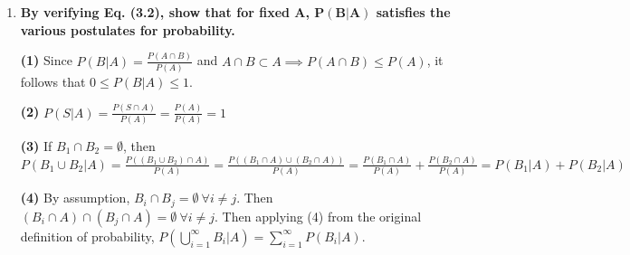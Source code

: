 \documentclass[10pt, oneside]{article}
\begin{document}
\begin{enumerate}[label=3.\arabic*]
\begin{enumerate}
\begin{align*}
	P_{A,B} (i + j \leq 9) &= P_{A,B} (i + j \leq 8) + P_A (3) P_B (6) + P_A (4) P_B (5) + P_A (5) P_B (4) + P_A (6) P_B (3) \\
	&= 0.895 + (0.2)(0.15) + (0.09)(0.15) + (0.07)(0.1) + (0.04)(0.1) \\
	&= \boxed{0.9495} \\
	P_{A,B} (i + j \leq 10) &= P_{A,B} (i + j \leq 9) + P_A (4) P_B (6) + P_A (5) P_B (5) + P_A (6) P_B (4) \\
	&= 0.9495 + (0.09)(0.15) + (0.07)(0.15) + (0.04)(0.1) \\
	&= \boxed{0.9775} \\
	P_{A,B} (i + j \leq 11) &= P_{A,B} (i + j \leq 10) + P_A (5) P_B (6) + P_A (6) P_B (5) \\
	&= 0.9775 + (0.07)(0.15) + (0.04)(0.15) \\
	&= \boxed{0.994} \\
	P_{A,B} (i + j \leq 12) &= P_{A,B} (i + j \leq 11) + P_A (6) P_B (6) \\
	&= 0.994 + (0.04)(0.15) \\
	&= \boxed{1}
	\end{align*}
	
	\end{enumerate}

\newpage
\item  \begin{tcolorbox}[
  colback=Cerulean!5!white,
  colframe=Cerulean!75!black]
\textbf{By verifying Eq. (3.2), show that for fixed $\bm{A}$, $\bm{P(B | A)}$ satisfies the various postulates for probability.}
\end{tcolorbox}

\textbf{(1)} Since $P(B | A) = \frac{P(A \cap B)}{P(A)}$ and $A \cap B \subset A \implies P(A \cap B) \leq P(A)$, it follows that $0 \leq P(B | A) \leq 1$.

\textbf{(2)} $P(S | A) = \frac{P(S \cap A)}{P(A)} = \frac{P(A)}{P(A)} = 1$

\textbf{(3)} If $B_1 \cap B_2 = \emptyset$, then $P(B_1 \cup B_2 | A) = \frac{P( (B_1 \cup B_2 ) \cap A)}{P(A)} = \frac{P((B_1 \cap A) \cup (B_2 \cap A))}{P(A)} = \frac{P(B_1 \cap A)}{P(A)} + \frac{P(B_2 \cap A)}{P(A)} = P(B_1 | A) + P(B_2 | A)$

\textbf{(4)} By assumption, $B_i \cap B_j = \emptyset \ \forall i \neq j$. Then $(B_i \cap A) \cap (B_j \cap A) = \emptyset \ \forall i \neq j$. Then applying (4) from the original definition of probability, $P(\bigcup^\infty_{i = 1} B_i | A) = \sum^\infty_{i = 1} P(B_i | A)$.


\end{enumerate}
\end{document}
